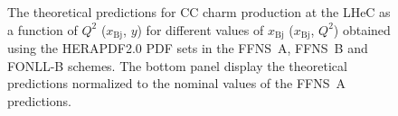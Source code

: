 \documentclass[pdftex,twocolumn,epjc3]{svjour3}          %
\newcommand{\xbj}{\ensuremath{x_{\text{Bj}}}\xspace}
\newcommand{\fonll} {{FONLL-B}\xspace}
\newcommand{\ffns} {{FFNS~A}\xspace}
\newcommand{\ffnsb} {{FFNS~B}\xspace}
\begin{document}
\begin{figure}
  \centering
  \caption{The theoretical predictions for CC charm production at the
    LHeC as a function of $Q^2$ ($\xbj$, $y$) for different values of
    $\xbj$ ($\xbj$, $Q^2$) obtained using the HERAPDF2.0 PDF sets in
    the \ffns, \ffnsb and \fonll schemes. The bottom panel display the
    theoretical predictions normalized to the nominal values of the
    \ffns predictions.}
  \label{fig:thpred-ff3abfonll}
\end{figure}
\end{document}

